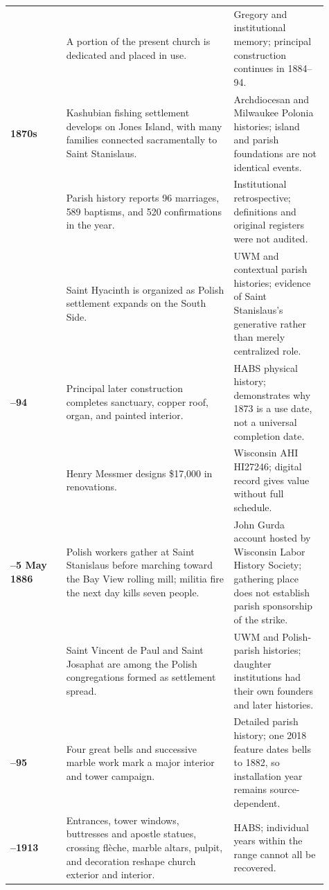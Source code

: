 \begin{longtable}{>{\bfseries\RaggedRight\arraybackslash}p{0.16\linewidth}>{\RaggedRight\arraybackslash}p{0.48\linewidth}>{\RaggedRight\arraybackslash}p{0.27\linewidth}}
1873 & A portion of the present church is dedicated and placed in use. & Gregory and institutional memory; principal construction continues in 1884--94.\\

1870s & Kashubian fishing settlement develops on Jones Island, with many families connected sacramentally to Saint Stanislaus. & Archdiocesan and Milwaukee Polonia histories; island and parish foundations are not identical events.\\

1882 & Parish history reports 96 marriages, 589 baptisms, and 520 confirmations in the year. & Institutional retrospective; definitions and original registers were not audited.\\

1883 & Saint Hyacinth is organized as Polish settlement expands on the South Side. & UWM and contextual parish histories; evidence of Saint Stanislaus's generative rather than merely centralized role.\\

1884--94 & Principal later construction completes sanctuary, copper roof, organ, and painted interior. & HABS physical history; demonstrates why 1873 is a use date, not a universal completion date.\\

1885 & Henry Messmer designs \$17,000 in renovations. & Wisconsin AHI HI27246; digital record gives value without full schedule.\\

4--5 May 1886 & Polish workers gather at Saint Stanislaus before marching toward the Bay View rolling mill; militia fire the next day kills seven people. & John Gurda account hosted by Wisconsin Labor History Society; gathering place does not establish parish sponsorship of the strike.\\

1888 & Saint Vincent de Paul and Saint Josaphat are among the Polish congregations formed as settlement spread. & UWM and Polish-parish histories; daughter institutions had their own founders and later histories.\\

1894--95 & Four great bells and successive marble work mark a major interior and tower campaign. & Detailed parish history; one 2018 feature dates bells to 1882, so installation year remains source-dependent.\\

1895--1913 & Entrances, tower windows, buttresses and apostle statues, crossing flèche, marble altars, pulpit, and decoration reshape church exterior and interior. & HABS; individual years within the range cannot all be recovered.\\


\end{longtable}
